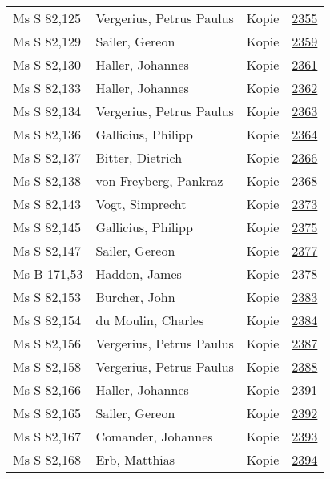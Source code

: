 \documentclass[10pt,a4paper,landscape]{report}
\begin{document}
\begin{longtable}{p{16cm}p{4cm}lr}
Ms S 82,125	&	Vergerius, Petrus Paulus	&	Kopie	&	\href{http://130.60.24.72/assignment/2355}{2355}\\
Ms S 82,129	&	Sailer, Gereon	&	Kopie	&	\href{http://130.60.24.72/assignment/2359}{2359}\\
Ms S 82,130	&	Haller, Johannes	&	Kopie	&	\href{http://130.60.24.72/assignment/2361}{2361}\\
Ms S 82,133	&	Haller, Johannes	&	Kopie	&	\href{http://130.60.24.72/assignment/2362}{2362}\\
Ms S 82,134	&	Vergerius, Petrus Paulus	&	Kopie	&	\href{http://130.60.24.72/assignment/2363}{2363}\\
Ms S 82,136	&	Gallicius, Philipp	&	Kopie	&	\href{http://130.60.24.72/assignment/2364}{2364}\\
Ms S 82,137	&	Bitter, Dietrich	&	Kopie	&	\href{http://130.60.24.72/assignment/2366}{2366}\\
Ms S 82,138	&	von Freyberg, Pankraz	&	Kopie	&	\href{http://130.60.24.72/assignment/2368}{2368}\\
Ms S 82,143	&	Vogt, Simprecht	&	Kopie	&	\href{http://130.60.24.72/assignment/2373}{2373}\\
Ms S 82,145	&	Gallicius, Philipp	&	Kopie	&	\href{http://130.60.24.72/assignment/2375}{2375}\\
Ms S 82,147	&	Sailer, Gereon	&	Kopie	&	\href{http://130.60.24.72/assignment/2377}{2377}\\
Ms B 171,53	&	Haddon, James	&	Kopie	&	\href{http://130.60.24.72/assignment/2378}{2378}\\
Ms S 82,153	&	Burcher, John	&	Kopie	&	\href{http://130.60.24.72/assignment/2383}{2383}\\
Ms S 82,154	&	du Moulin, Charles	&	Kopie	&	\href{http://130.60.24.72/assignment/2384}{2384}\\
Ms S 82,156	&	Vergerius, Petrus Paulus	&	Kopie	&	\href{http://130.60.24.72/assignment/2387}{2387}\\
Ms S 82,158	&	Vergerius, Petrus Paulus	&	Kopie	&	\href{http://130.60.24.72/assignment/2388}{2388}\\
Ms S 82,166	&	Haller, Johannes	&	Kopie	&	\href{http://130.60.24.72/assignment/2391}{2391}\\
Ms S 82,165	&	Sailer, Gereon	&	Kopie	&	\href{http://130.60.24.72/assignment/2392}{2392}\\
Ms S 82,167	&	Comander, Johannes	&	Kopie	&	\href{http://130.60.24.72/assignment/2393}{2393}\\
Ms S 82,168	&	Erb, Matthias	&	Kopie	&	\href{http://130.60.24.72/assignment/2394}{2394}\\

\end{longtable}
\end{document}
